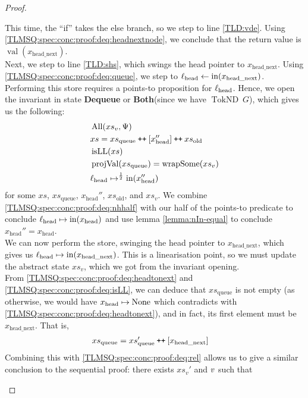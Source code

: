 \documentclass[a4paper, 10pt]{report}
\theoremstyle{definition}
\newcommand{\xsc}{xs}
\newcommand{\xsqueue}{xs_{\mathrm{queue}}}
\newcommand{\xsold}{xs_{\mathrm{old}}}
\newcommand{\isLL}{\operatorname{isLL}}
\newcommand{\AllP}{\operatorname{All}}
\newcommand{\projval}{\operatorname{projVal}}
\newcommand{\wrapsome}{\operatorname{wrapSome}}
\newcommand{\locN}[1]{\loc_{\mathrm{#1}}}
\newcommand{\lochead}{\locN{head}}
\newcommand{\nIn}[1]{\operatorname{in}(#1)}
\newcommand{\nVal}[1]{\operatorname{val}(#1)}
\newcommand{\node}{x}
\newcommand{\nodeN}[1]{\node_{\mathrm{#1}}}
\newcommand{\nodehead}{\nodeN{head}}
\newcommand{\nodeheadnext}{\nodeN{head\_next}}
\newcommand{\absvalue}{\val}
\newcommand{\absvalueList}{xs_v}
\newcommand{\DequeueState}{\textbf{Dequeue}\xspace}
\newcommand{\BothState}{\textbf{Both}\xspace}
\newcommand{\Qg}{G}
\newcommand{\TokND}[1]{\operatorname{TokND} ~ #1}
\newcommand{\TokNDQg}{\TokND{\Qg}}
\newcommand\catenate{\mathbin{\text{\ttfamily\upshape ++}}}
\begin{document}
\begin{proof}
\begin{itemize}
  This time, the ``if'' takes the else branch, so we step to line \ref{TLD:vde}. Using \ref{TLMSQ:spec:conc:proof:deq:headnextnode}, we conclude that the return value is $\nVal{\nodeheadnext}$.\\
  Next, we step to line \ref{TLD:shs}, which swings the head pointer to $\nodeheadnext$. Using \ref{TLMSQ:spec:conc:proof:deq:queue}, we step to $\lochead \gets \nIn{\nodeheadnext}$. Performing this store requires a points-to proposition for $\lochead$. Hence, we open the invariant in state \DequeueState or \BothState (since we have $\TokNDQg$), which gives us the following:
  \begin{align}
    &\AllP(\absvalueList, \Psi)\label{TLMSQ:spec:conc:proof:deq:allP}\\
    &\xsc = \xsqueue \catenate [\nodehead''] \catenate \xsold\label{TLMSQ:spec:conc:proof:deq:xsrel}\\
    &\isLL(\xsc)\label{TLMSQ:spec:conc:proof:deq:isLL}\\
    &\projval(\xsqueue) = \wrapsome(\absvalueList)\label{TLMSQ:spec:conc:proof:deq:rel}\\
    &\lochead \mapsto^{\frac{1}{2}} \nIn{\nodehead''}\label{TLMSQ:spec:conc:proof:deq:nhhalf}
  \end{align}
  for some $\xsc$, $\xsqueue$, $\nodehead''$,  $\xsold$, and $\absvalueList$. We combine \ref{TLMSQ:spec:conc:proof:deq:nhhalf} with our half of the points-to predicate to conclude $\lochead \mapsto \nIn{\nodehead}$ and use lemma \ref{lemma:nIn-equal} to conclude $\nodehead'' = \nodehead$.\\
  We can now perform the store, swinging the head pointer to $\nodeheadnext$, which gives us $\lochead \mapsto \nIn{\nodeheadnext}$. This is a linearisation point, so we must update the abstract state $\absvalueList$, which we got from the invariant opening.\\
  From \ref{TLMSQ:spec:conc:proof:deq:headtonext} and \ref{TLMSQ:spec:conc:proof:deq:isLL}, we can deduce that $\xsqueue$ is not empty (as otherwise, we would have $\nodehead \mapsto \None$ which contradicts with \ref{TLMSQ:spec:conc:proof:deq:headtonext}), and in fact, its first element must be $\nodeheadnext$. That is,
  \begin{align}
    &\xsqueue = \xsqueue' \catenate [\nodeheadnext]\label{TLMSQ:spec:conc:proof:deq:xsqueue}
  \end{align}
  Combining this with \ref{TLMSQ:spec:conc:proof:deq:rel} allows us to give a similar conclusion to the sequential proof: there exists $\absvalueList'$ and $\absvalue$ such that

\end{itemize}
\end{proof}
\end{document}

